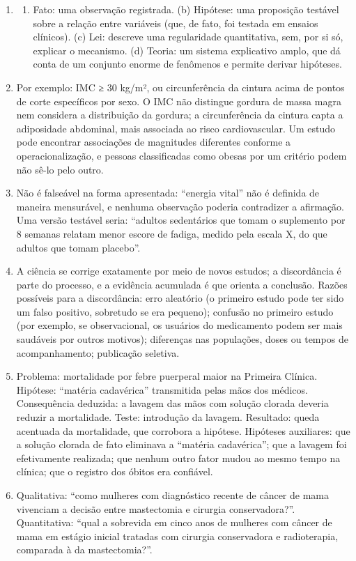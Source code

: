 \documentclass[
]{book}
\providecommand{\tightlist}{%
  \setlength{\itemsep}{0pt}\setlength{\parskip}{0pt}}
\begin{document}
\begin{enumerate}
\def\labelenumi{\arabic{enumi}.}
\item
  \begin{enumerate}
  \def\labelenumii{(\alph{enumii})}
  \tightlist
  \item
    Fato: uma observação registrada. (b) Hipótese: uma proposição testável sobre a relação entre variáveis (que, de fato, foi testada em ensaios clínicos). (c) Lei: descreve uma regularidade quantitativa, sem, por si só, explicar o mecanismo. (d) Teoria: um sistema explicativo amplo, que dá conta de um conjunto enorme de fenômenos e permite derivar hipóteses.
  \end{enumerate}
\item
  Por exemplo: IMC ≥ 30 kg/m², ou circunferência da cintura acima de pontos de corte específicos por sexo. O IMC não distingue gordura de massa magra nem considera a distribuição da gordura; a circunferência da cintura capta a adiposidade abdominal, mais associada ao risco cardiovascular. Um estudo pode encontrar associações de magnitudes diferentes conforme a operacionalização, e pessoas classificadas como obesas por um critério podem não sê-lo pelo outro.
\item
  Não é falseável na forma apresentada: ``energia vital'' não é definida de maneira mensurável, e nenhuma observação poderia contradizer a afirmação. Uma versão testável seria: ``adultos sedentários que tomam o suplemento por 8 semanas relatam menor escore de fadiga, medido pela escala X, do que adultos que tomam placebo''.
\item
  A ciência se corrige exatamente por meio de novos estudos; a discordância é parte do processo, e a evidência acumulada é que orienta a conclusão. Razões possíveis para a discordância: erro aleatório (o primeiro estudo pode ter sido um falso positivo, sobretudo se era pequeno); confusão no primeiro estudo (por exemplo, se observacional, os usuários do medicamento podem ser mais saudáveis por outros motivos); diferenças nas populações, doses ou tempos de acompanhamento; publicação seletiva.
\item
  Problema: mortalidade por febre puerperal maior na Primeira Clínica. Hipótese: ``matéria cadavérica'' transmitida pelas mãos dos médicos. Consequência deduzida: a lavagem das mãos com solução clorada deveria reduzir a mortalidade. Teste: introdução da lavagem. Resultado: queda acentuada da mortalidade, que corrobora a hipótese. Hipóteses auxiliares: que a solução clorada de fato eliminava a ``matéria cadavérica''; que a lavagem foi efetivamente realizada; que nenhum outro fator mudou ao mesmo tempo na clínica; que o registro dos óbitos era confiável.
\item
  Qualitativa: ``como mulheres com diagnóstico recente de câncer de mama vivenciam a decisão entre mastectomia e cirurgia conservadora?''. Quantitativa: ``qual a sobrevida em cinco anos de mulheres com câncer de mama em estágio inicial tratadas com cirurgia conservadora e radioterapia, comparada à da mastectomia?''.
\end{enumerate}
\end{document}
